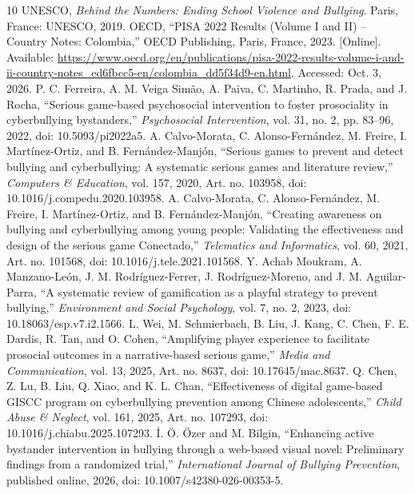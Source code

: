 \documentclass[conference]{IEEEtran}
\begin{document}
\begin{thebibliography}{10}
 UNESCO, \textit{Behind the Numbers: Ending School Violence and Bullying}. Paris, France: UNESCO, 2019.
 OECD, ``PISA 2022 Results (Volume I and II) -- Country Notes: Colombia,'' OECD Publishing, Paris, France, 2023. [Online]. Available: \url{https://www.oecd.org/en/publications/pisa-2022-results-volume-i-and-ii-country-notes_ed6fbcc5-en/colombia_dd5f34d9-en.html}. Accessed: Oct. 3, 2026.
 P. C. Ferreira, A. M. Veiga Simão, A. Paiva, C. Martinho, R. Prada, and J. Rocha, ``Serious game-based psychosocial intervention to foster prosociality in cyberbullying bystanders,'' \textit{Psychosocial Intervention}, vol. 31, no. 2, pp. 83--96, 2022, doi: 10.5093/pi2022a5.
 A. Calvo-Morata, C. Alonso-Fernández, M. Freire, I. Martínez-Ortiz, and B. Fernández-Manjón, ``Serious games to prevent and detect bullying and cyberbullying: A systematic serious games and literature review,'' \textit{Computers \& Education}, vol. 157, 2020, Art. no. 103958, doi: 10.1016/j.compedu.2020.103958.
 A. Calvo-Morata, C. Alonso-Fernández, M. Freire, I. Martínez-Ortiz, and B. Fernández-Manjón, ``Creating awareness on bullying and cyberbullying among young people: Validating the effectiveness and design of the serious game Conectado,'' \textit{Telematics and Informatics}, vol. 60, 2021, Art. no. 101568, doi: 10.1016/j.tele.2021.101568.
 Y. Achab Moukram, A. Manzano-León, J. M. Rodríguez-Ferrer, J. Rodríguez-Moreno, and J. M. Aguilar-Parra, ``A systematic review of gamification as a playful strategy to prevent bullying,'' \textit{Environment and Social Psychology}, vol. 7, no. 2, 2023, doi: 10.18063/esp.v7.i2.1566.
 L. Wei, M. Schmierbach, B. Liu, J. Kang, C. Chen, F. E. Dardis, R. Tan, and O. Cohen, ``Amplifying player experience to facilitate prosocial outcomes in a narrative-based serious game,'' \textit{Media and Communication}, vol. 13, 2025, Art. no. 8637, doi: 10.17645/mac.8637.
 Q. Chen, Z. Lu, B. Liu, Q. Xiao, and K. L. Chan, ``Effectiveness of digital game-based GISCC program on cyberbullying prevention among Chinese adolescents,'' \textit{Child Abuse \& Neglect}, vol. 161, 2025, Art. no. 107293, doi: 10.1016/j.chiabu.2025.107293.
 \.I. Ö. Özer and M. Bilgin, ``Enhancing active bystander intervention in bullying through a web-based visual novel: Preliminary findings from a randomized trial,'' \textit{International Journal of Bullying Prevention}, published online, 2026, doi: 10.1007/s42380-026-00353-5.

\end{thebibliography}
\end{document}
